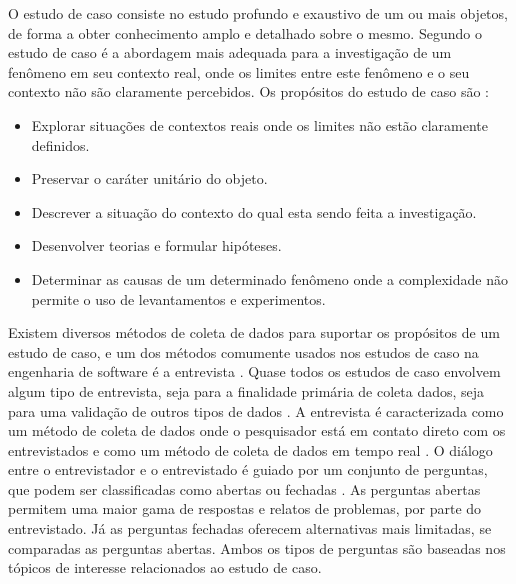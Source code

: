O estudo de caso consiste no estudo profundo e exaustivo de um ou mais objetos, de forma a obter conhecimento amplo e detalhado sobre o mesmo. Segundo  o estudo de caso é a abordagem mais adequada para a investigação de um fenômeno em seu contexto real, onde os limites entre este fenômeno e o seu contexto não são claramente percebidos. Os propósitos do estudo de caso são \cite{gil2002}:

\begin{itemize}
	\item Explorar situações de contextos reais onde os limites não estão claramente definidos.
	\item Preservar o caráter unitário do objeto.
	\item Descrever a situação do contexto do qual esta sendo feita a investigação.
	\item Desenvolver teorias e formular hipóteses.
	\item Determinar as causas de um determinado fenômeno onde a complexidade não permite o uso de levantamentos e experimentos.
\end{itemize}

Existem diversos métodos de coleta de dados para suportar os propósitos de um estudo de caso, e um dos métodos comumente usados nos estudos de caso na engenharia de software é a entrevista \cite{caseStudySE}. Quase todos os estudos de caso envolvem algum tipo de entrevista, seja para a finalidade primária de coleta dados, seja para uma validação de outros tipos de dados \cite{caseStudySE}. A entrevista é caracterizada como um método de coleta de dados onde o pesquisador está em contato direto com os entrevistados e como um método de coleta de dados em tempo real \cite{caseStudySE}. O diálogo entre o entrevistador e o entrevistado é guiado por um conjunto de perguntas, que podem ser classificadas como abertas ou fechadas \cite{caseStudySE}. As perguntas abertas permitem uma maior gama de respostas e relatos de problemas, por parte do entrevistado. Já as perguntas fechadas oferecem alternativas mais limitadas, se comparadas as perguntas abertas. Ambos os tipos de perguntas são baseadas nos tópicos de interesse relacionados ao estudo de caso. 

